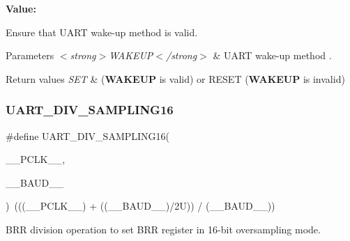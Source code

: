 {\bfseries Value\+:}
\begin{DoxyCode}{0}

\end{DoxyCode}


Ensure that U\+A\+RT wake-\/up method is valid. 


\begin{DoxyParams}{Parameters}
{\em $<$strong$>$\+W\+A\+K\+E\+U\+P$<$/strong$>$} & U\+A\+RT wake-\/up method . \\
\hline
\end{DoxyParams}

\begin{DoxyRetVals}{Return values}
{\em S\+ET} & ({\bfseries{W\+A\+K\+E\+UP}} is valid) or R\+E\+S\+ET ({\bfseries{W\+A\+K\+E\+UP}} is invalid) \\
\hline
\end{DoxyRetVals}
\mbox{\label{group___u_a_r_t___private___macros_gac2423ff86559eb91198bcc438caec865}} 
\subsubsection{\texorpdfstring{UART\_DIV\_SAMPLING16}{UART\_DIV\_SAMPLING16}}
{\footnotesize\ttfamily \#define U\+A\+R\+T\+\_\+\+D\+I\+V\+\_\+\+S\+A\+M\+P\+L\+I\+N\+G16(\begin{DoxyParamCaption}\item[{}]{\+\_\+\+\_\+\+P\+C\+L\+K\+\_\+\+\_\+,  }\item[{}]{\+\_\+\+\_\+\+B\+A\+U\+D\+\_\+\+\_\+ }\end{DoxyParamCaption})~(((\+\_\+\+\_\+\+P\+C\+L\+K\+\_\+\+\_\+) + ((\+\_\+\+\_\+\+B\+A\+U\+D\+\_\+\+\_\+)/2\+U)) / (\+\_\+\+\_\+\+B\+A\+U\+D\+\_\+\+\_\+))}



B\+RR division operation to set B\+RR register in 16-\/bit oversampling mode. 


